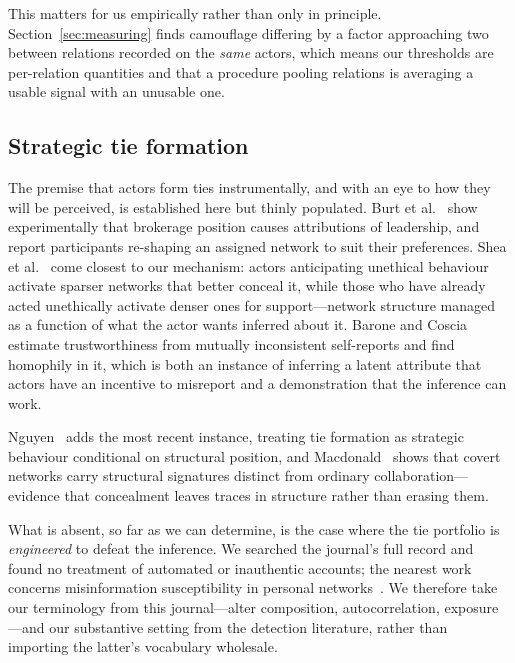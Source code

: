 \documentclass[onecolumn,pdflatex,sn-basic,Numbered]{sn-jnl}
\theoremstyle{thmstyleone}
\theoremstyle{thmstylethree}
\begin{document}
This matters for us empirically rather than only in principle.
Section~\ref{sec:measuring} finds camouflage differing by a factor approaching two
between relations recorded on the \emph{same} actors, which means our thresholds are
per-relation quantities and that a procedure pooling relations is averaging a usable
signal with an unusable one.

\subsection{Strategic tie formation}
\label{sec:related-strategic}

The premise that actors form ties instrumentally, and with an eye to how they will be
perceived, is established here but thinly populated. Burt et al.~\citep{burt2021network}
show experimentally that brokerage position causes attributions of leadership, and
report participants re-shaping an assigned network to suit their preferences. Shea et
al.~\citep{shea2019cheater} come closest to our mechanism: actors anticipating
unethical behaviour activate sparser networks that better conceal it, while those who
have already acted unethically activate denser ones for support---network structure
managed as a function of what the actor wants inferred about it. Barone and
Coscia~\citep{barone2018birds} estimate trustworthiness from mutually inconsistent
self-reports and find homophily in it, which is both an instance of inferring a
latent attribute that actors have an incentive to misreport and a demonstration that
the inference can work.

Nguyen~\citep{nguyen2026agency} adds the most recent instance, treating tie
formation as strategic behaviour conditional on structural position, and
Macdonald~\citep{macdonald2026wiretap} shows that covert networks carry
structural signatures distinct from ordinary collaboration---evidence that concealment
leaves traces in structure rather than erasing them.

What is absent, so far as we can determine, is the case where the tie portfolio is
\emph{engineered} to defeat the inference. We searched the journal's full record and
found no treatment of automated or inauthentic accounts; the nearest work concerns
misinformation susceptibility in personal networks~\citep{choi2026who}. We therefore
take our terminology from this journal---alter composition, autocorrelation,
exposure---and our substantive setting from the detection literature, rather than
importing the latter's vocabulary wholesale.
\end{document}
